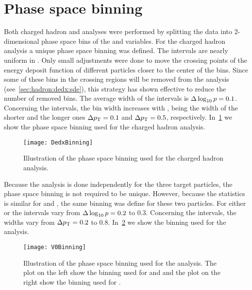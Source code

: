\section{Phase space binning}
\label{sec:hadron:binning}

Both charged hadron and \vzero analyses were performed
by splitting the data into 2-dimensional phase space bins
of the \pp and \pT variables. For the
charged hadron analysis a unique phase space
binning was defined. The \pp intervals 
are nearly uniform in \logp. Only small adjustments
were done to move the crossing points of the energy deposit function
of different particles closer to the center of the bins.
Since some of these bins in the crossing regions
will be removed from the analysis (see~\cref{sec:hadron:dedx:sde}),
this strategy has shown effective to reduce the number of
removed bins. The average width of the \logp intervals is
$\Delta\log_{10} p=0.1$. Concerning the \pT intervals, the bin width
increases with \pT, being the width of the shorter and the longer ones
$\Delta p_\text{T}=0.1$ and  $\Delta p_\text{T}=0.5$, respectively.  
In~\cref{fig:hadron:binning:dedx} we show the
phase space binning used for the charged hadron analysis.


\begin{figure}[!ht]
  \centering
  \texttt{[image: DedxBinning]}
  \caption{Illustration of the phase space binning used
    for the charged hadron analysis.}
  \label{fig:hadron:binning:dedx}
\end{figure}

Because the \vzero analysis is done independently for the three target particles,
the phase space binning is not required to be unique.
However, because the statistics is similar for \lamb and \antilamb,
the same binning was define for these two particles.
For either \lambs or \kzeros the \pp intervals vary from
$\Delta\log_{10} p=0.2$ to $0.3$. Concerning the \pT intervals,
the widths vary from $\Delta p_\text{T} = 0.2$ to $0.8$.
In~\cref{fig:hadron:binning:vzero} we show the 
binning used for the \vzero analysis.

\begin{figure}[!ht]
  \centering
  \texttt{[image: V0Binning]}
  \caption{Illustration of the phase space binning used
    for the \vzero analysis. The plot on the left show the binning
    used for \lamb and \antilamb and the plot on the right
    show the binning used for \kzeros.}
  \label{fig:hadron:binning:vzero}
\end{figure}


